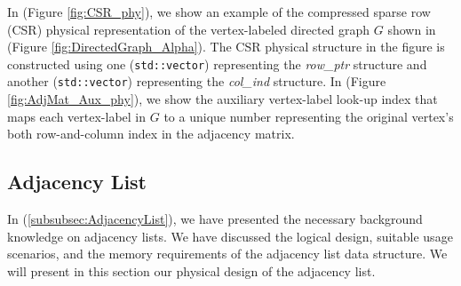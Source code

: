 {%

In (Figure \ref{fig:CSR_phy}), we show an example of the compressed sparse row (CSR) physical representation of the vertex-labeled directed graph $G$ shown in (Figure \ref{fig:DirectedGraph_Alpha}). The CSR physical structure in the figure is constructed using one (\texttt{std::vector}) representing the \textit{row\_ptr} structure and another (\texttt{std::vector}) representing the \textit{col\_ind} structure. In (Figure \ref{fig:AdjMat_Aux_phy}), we show the auxiliary vertex-label look-up index that maps each vertex-label in $G$ to a unique number representing the original vertex's both row-and-column index in the adjacency matrix.


\subsection{Adjacency List}
\label{subsec:PhyDesign-AdjacencyList}

In (\ref{subsubsec:AdjacencyList}), we have presented the necessary background knowledge on adjacency lists. We have discussed the logical design, suitable usage scenarios, and the memory requirements of the adjacency list data structure. We will present in this section our physical design of the adjacency list.


}
